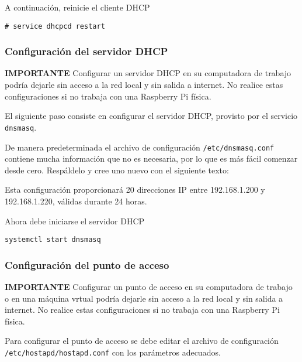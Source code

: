 A continuación, reinicie el cliente DHCP

\begin{Verbatim}
# service dhcpcd restart
\end{Verbatim}

\subsubsection{Configuración del servidor DHCP}%
\label{sec:ap-dhcp}

\begin{importantbox}{\bfseries IMPORTANTE}
Configurar un servidor DHCP en su computadora de trabajo podría dejarle sin acceso a la red local y sin salida a internet. No realice estas configuraciones si no trabaja con una Raspberry Pi física.
\end{importantbox}

El siguiente paso consiste en configurar el servidor DHCP, provisto por el servicio \texttt{dnsmasq}.

De manera predeterminada el archivo de configuración \texttt{/etc/dnsmasq.conf} contiene mucha información que no es necesaria, por lo que es más fácil comenzar desde cero.
Respáldelo y cree uno nuevo con el siguiente texto:


Esta configuración proporcionará 20 direcciones IP entre 192.168.1.200 y 192.168.1.220, válidas durante 24 horas.

Ahora debe iniciarse el servidor DHCP

\begin{Verbatim}
systemctl start dnsmasq
\end{Verbatim}

\subsubsection{Configuración del punto de acceso}%
\label{sec:ap-hotspot}
\begin{importantbox}{\bfseries IMPORTANTE}
Configurar un punto de acceso en su computadora de trabajo o en una máquina vrtual podría dejarle sin acceso a la red local y sin salida a internet. No realice estas configuraciones si no trabaja con una Raspberry Pi física.
\end{importantbox}

Para configurar el punto de acceso se debe editar el archivo de configuración \texttt{/etc/hostapd/hostapd.conf} con los parámetros adecuados.

